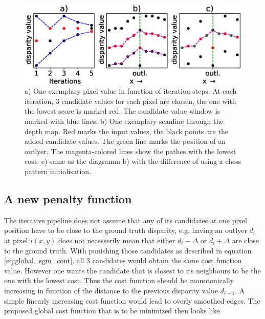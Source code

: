 \documentclass  [
  paper    = a4,
  BCOR     = 10mm,
  twoside,
  fontsize = 12pt,
  fleqn,
  toc      = bibnumbered,
  toc      = listofnumbered,
  numbers  = noendperiod,
  headings = normal,
  listof   = leveldown,
  version  = 3.03
]                                       {scrreprt}
\begin{document}
\begin{figure}
	\centering
	\includegraphics[width=1\linewidth]{images/iteration_steps}
	\caption[Iteration steps]{a) One exemplary pixel value in function of iteration steps. At each iteration, 3 candidate values for each pixel are chosen, the one with the lowest score is marked red. The candidate value window is marked with blue lines. b) One exemplary scanline through the depth map. Red marks the input values, the black points are the added candidate values. The green line marks the position of an outlyer. The magenta-colored lines show the pathes with the lowest cost. c) same as the diagramm b) with the difference of using a chess pattern initialisation. }
	\label{fig:iterationsteps}
\end{figure}

\subsection{A new penalty function} 
The iterative pipeline does not assume that any of its candidates at one pixel position have to be close to the ground truth disparity, e.g. having an outlyer $d_i$ at pixel $i(x,y)$ does not necesserily mean that either $d_i-\Delta$ or $d_i+\Delta$ are close to the ground truth. With punishing those candidates as described in equation \ref{eq:global_sgm_cont}, all 3 candidates would obtain the same cost function value. However one wants the candidate that is closest to its neighbours to be the one with the lowest cost. Thus the cost function should be monotonically increasing in function of the distance to the previous disparity value $d_{i-1}$. A simple linearly increasing cost function would lead to overly smoothed edges. The proposed global cost function that is to be minimized then looks like
\end{document}
